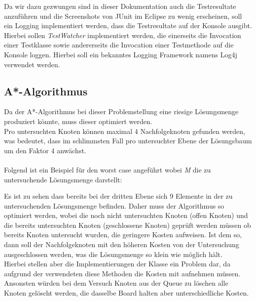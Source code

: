 \documentclass[11pt, a4paper, twoside]{article}   	%
\begin{document}
Da wir dazu gezwungen sind in dieser Dokumentation auch die Testresultate anzuführen und die Screenshots von JUnit im Eclipse zu wenig erscheinen, soll ein Logging implementiert werden, dass die Testresultate auf der Konsole ausgibt. Hierbei sollen \emph{TestWatcher} implementiert werden, die einerseits die Invocation einer Testklasse sowie andererseits die Invocation einer Testmethode auf die Konsole loggen. Hierbei soll ein bekanntes Logging Framework namens Log4j verwendet werden.

\subsection{A*-Algorithmus}
Da der A*-Algorithmus bei dieser Problemstellung eine riesige Lösungsmenge produziert könnte, muss dieser optimiert werden.\\
Pro untersuchten Knoten können maximal 4 Nachfolgeknoten gefunden werden, was bedeutet, dass im schlimmsten Fall pro untersuchter Ebene der Lösungsbaum um den Faktor 4 anwächst.\\\\
Folgend ist ein Beispiel für den worst case angeführt wobei \emph{M} die zu untersuchende Lösungsmenge darstellt:
Es ist zu sehen dass bereits bei der dritten Ebene sich 9 Elemente in der zu untersuchenden Lösungsmenge befinden. Daher muss der Algorithmus so optimiert werden, wobei die noch nicht untersuchten Knoten (offen Knoten) und die bereits untersuchten Knoten (geschlossene Knoten) geprüft werden müssen ob bereits Knoten untersucht wurden, die geringere Kosten aufweisen. Ist dem so, dann soll der Nachfolgeknoten mit den höheren Kosten von der Untersuchung ausgeschlossen werden, was die Lösungsmenge so klein wie möglich hält.\\
Hierbei stellen aber die Implementierungen  der Klasse  ein Problem dar, da aufgrund der verwendeten  diese Methoden die Kosten mit aufnehmen müssen.\\
Ansonsten würden bei dem Versuch Knoten aus der Queue zu löschen alle Knoten gelöscht werden, die dasselbe Board halten aber unterschiedliche Kosten.\\
\end{document}
